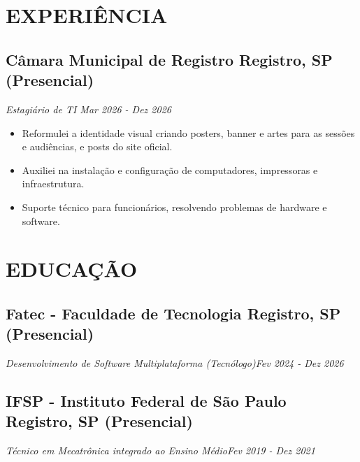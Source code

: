 \documentclass[a4paper,10pt]{article}
\begin{document}

\section{EXPERIÊNCIA }
    \subsection*{\texorpdfstring{
            \textbf{Câmara Municipal de Registro} \hfill Registro, SP (Presencial)
        }{
            Câmara Municipal de Registro -- Registro, SP (Presencial)
        }}
    \textit{Estagiário de TI  \hfill Mar 2026 - Dez 2026}
        \begin{itemize} 
            \item Reformulei a identidade visual criando posters, banner e artes para as sessões e audiências, e posts do site oficial.
            \item Auxiliei na instalação e configuração de computadores, impressoras e infraestrutura.
            \item Suporte técnico para funcionários, resolvendo problemas de hardware e software.
        \end{itemize}



\section{EDUCAÇÃO}
    \subsection*{\texorpdfstring{
            \textbf{Fatec - Faculdade de Tecnologia} \hfill Registro, SP (Presencial)
        }{
            Fatec Registro (Educação) -- Localização
        }}
    \textit{Desenvolvimento de Software Multiplataforma (Tecnólogo)\hfill Fev 2024 - Dez 2026}

    \subsection*{\texorpdfstring{
            \textbf{IFSP - Instituto Federal de São Paulo} \hfill Registro, SP (Presencial)
        }{
            IFSP Registro (Educação) -- Localização
        }}
    \textit{Técnico em Mecatrônica integrado ao Ensino Médio\hfill Fev 2019 - Dez 2021}
\end{document}
